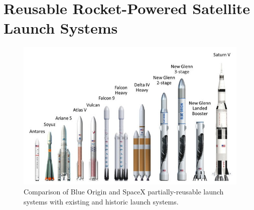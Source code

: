     
    
    
    
    
    
    
    
    
    \section{Reusable Rocket-Powered Satellite Launch Systems}
    
    \begin{figure}[ht]
    	\centering
    	\includegraphics[width=0.9\linewidth]{figures/2_literature-review/LaunchVehicles}
    	\caption{Comparison of Blue Origin and SpaceX partially-reusable launch systems with existing and historic launch systems\cite{BlueOrigin}.}
    	\label{fig:LaunchVehicles}
    \end{figure}
    

